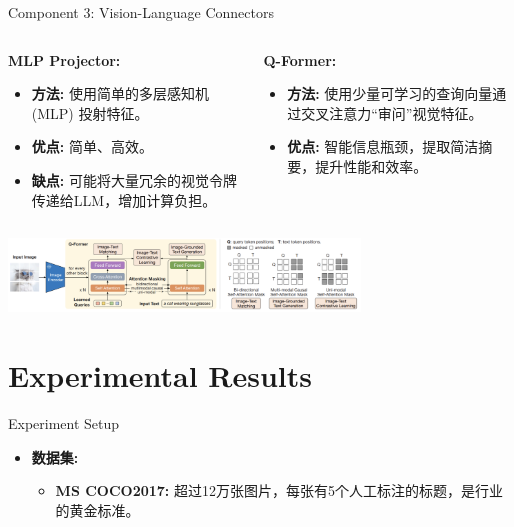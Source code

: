 \documentclass{beamer}
\begin{document}
\begin{CJK}{UTF8}{gbsn}
\begin{frame}{Component 3: Vision-Language Connectors}
    \begin{columns}[T]
        \begin{column}{0.5\textwidth}
            \textbf{MLP Projector:}
            \begin{itemize}
                \item \textbf{方法:} 使用简单的多层感知机 (MLP) 投射特征。
                \item \textbf{优点:} 简单、高效。
                \item \textbf{缺点:} 可能将大量冗余的视觉令牌传递给LLM，增加计算负担。
            \end{itemize}
        \end{column}
        
        \begin{column}{0.5\textwidth}
            \textbf{Q-Former:}
            \begin{itemize}
                \item \textbf{方法:} 使用少量可学习的查询向量通过交叉注意力“审问”视觉特征。
                \item \textbf{优点:} 智能信息瓶颈，提取简洁摘要，提升性能和效率。
            \end{itemize}
            
        \end{column}
    \end{columns}
    \begin{center}
        \includegraphics[width=0.7\textwidth]{images/qformer_architecture.png}
    \end{center}
\end{frame}


\section{Experimental Results}

\begin{frame}{Experiment Setup}
    \begin{itemize}
        \item \textbf{数据集:}
        \begin{itemize}
            \item \textbf{MS COCO2017:} 超过12万张图片，每张有5个人工标注的标题，是行业的黄金标准。
        \end{itemize}
        \medskip
        

\end{itemize}
\end{frame}
\end{CJK}
\end{document}
